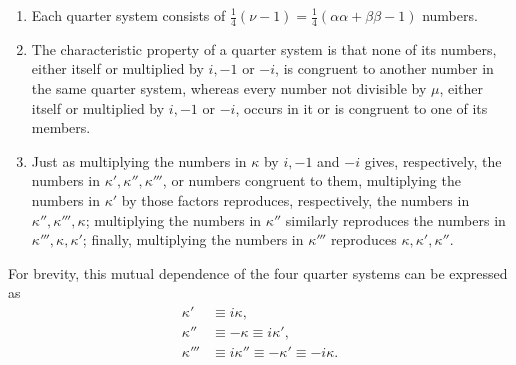 \begin{enumerate}
\renewcommand{\labelenumi}{\arabic{enumi})}
\item Each quarter system consists of $\frac14(\nu-1)=\frac14(\alpha\alpha+\beta\beta-1)$ numbers.
\item The characteristic property of a quarter system is that none of its numbers, either itself or multiplied by $i,-1$ or $-i$, is congruent to another number in the same quarter system, whereas every number not divisible by $\mu$, either itself or multiplied by $i,-1$ or $-i$, occurs in it or is congruent to one of its members.
\item Just as multiplying the numbers in $\kappa$ by $i,-1$ and $-i$ gives, respectively, the numbers in $\kappa',\kappa'',\kappa'''$, or numbers congruent to them, multiplying the numbers in $\kappa'$ by those factors reproduces, respectively, the numbers in $\kappa'',\kappa''',\kappa$; multiplying the numbers in $\kappa''$ similarly reproduces the numbers in $\kappa''',\kappa,\kappa'$; finally, multiplying the numbers in $\kappa'''$ reproduces $\kappa,\kappa',\kappa''$.
\end{enumerate}

For brevity, this mutual dependence of the four quarter systems can be expressed as
\[
\begin{aligned}
\kappa'&\equiv i\kappa,\\
\kappa''&\equiv-\kappa\equiv i\kappa',\\
\kappa'''&\equiv i\kappa''\equiv-\kappa'\equiv-i\kappa.
\end{aligned}
\]
